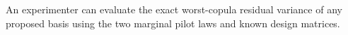 An experimenter can evaluate the exact worst-copula residual variance of any proposed basis using the two marginal pilot laws and known design matrices.